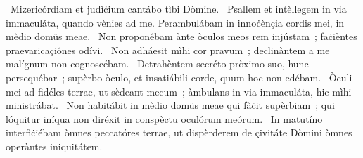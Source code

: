 ~Mizericórdiam et judìċium cantábo tìbi Dòmine. 
~Psallem et intèllegem in via immaculáta, quando vènies ad me. Perambulábam in innoċènçia cordis mei, in mèdio domüs meae. 
~Non proponébam ànte òculos meos rem injústam~; faċièntes praevaricaçiónes odívi. 
~Non adháesit mìhi cor pravum~; declinàntem a me malígnum non cognoscébam. 
~Detrahèntem secréto pròximo suo, hunc persequébar~; supèrbo òculo, et insatiábili corde, quum hoc non edébam. 
~Òculi mei ad fidéles terrae, ut sèdeant mecum~; àmbulans in via immaculáta, hic mìhi ministrábat. 
~Non habitábit in mèdio domüs meae qui fàċit supèrbiam~; qui lóquitur iníqua non diréxit in conspèctu oculórum meórum. 
~In matutíno interfiċiébam òmnes peccatóres terrae, ut dispèrderem de çivitáte Dòmini òmnes operàntes iniquitátem. 
